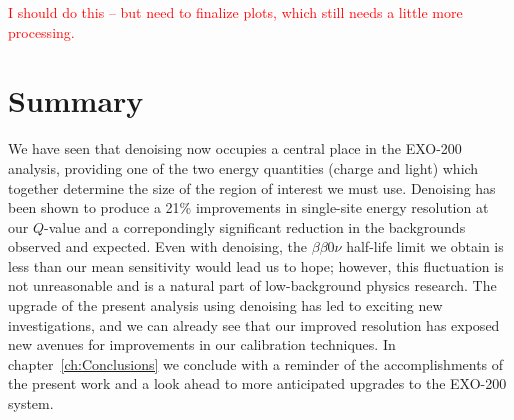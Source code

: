 \textcolor{red}{I should do this -- but need to finalize plots, which still needs a little more processing.}

\section{Summary}\label{sec:ResultSummary}

We have seen that denoising now occupies a central place in the EXO-200 analysis, providing one of the two energy quantities (charge and light) which together determine the size of the region of interest we must use.  Denoising has been shown to produce a 21\% improvements in single-site energy resolution at our $Q$-value and a correpondingly significant reduction in the backgrounds observed and expected.  Even with denoising, the $\beta\beta 0\nu$ half-life limit we obtain is less than our mean sensitivity would lead us to hope; however, this fluctuation is not unreasonable and is a natural part of low-background physics research.  The upgrade of the present analysis using denoising has led to exciting new investigations, and we can already see that our improved resolution has exposed new avenues for improvements in our calibration techniques.  In chapter~\ref{ch:Conclusions} we conclude with a reminder of the accomplishments of the present work and a look ahead to more anticipated upgrades to the EXO-200 system.

